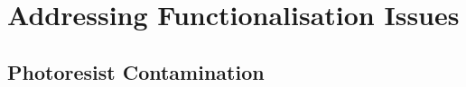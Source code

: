 \documentclass[
  a4paper,
]{scrbook}
\begin{document}
\hypertarget{sec-impediments}{%
\section{Addressing Functionalisation Issues}\label{sec-impediments}}

\hypertarget{sec-photoresist-contamination}{%
\subsection{Photoresist
Contamination}\label{sec-photoresist-contamination}}

\begin{figure}

\begin{minipage}[t]{0.47\linewidth}

{\centering 


}

\subcaption{\label{fig-350ms-SU8}}
\end{minipage}%
%
\begin{minipage}[t]{0.05\linewidth}

{\centering 

~

}

\end{minipage}%
%
\begin{minipage}[t]{0.47\linewidth}


\end{minipage}
\end{figure}
\end{document}
